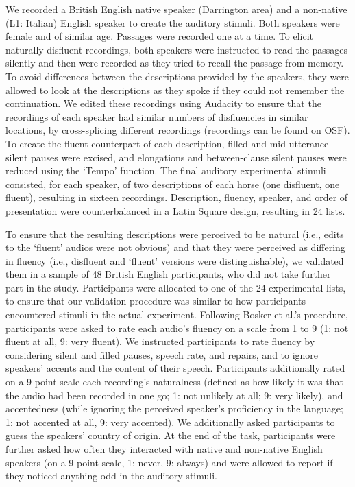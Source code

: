\documentclass[
  man,floatsintext]{apa7}
\begin{document}
We recorded a British English native speaker (Darrington area) and a non-native (L1: Italian) English speaker to create the auditory stimuli. Both speakers were female and of similar age. Passages were recorded one at a time. To elicit naturally disfluent recordings, both speakers were instructed to read the passages silently and then were recorded as they tried to recall the passage from memory. To avoid differences between the descriptions provided by the speakers, they were allowed to look at the descriptions as they spoke if they could not remember the continuation. We edited these recordings using Audacity to ensure that the recordings of each speaker had similar numbers of disfluencies in similar locations, by cross-splicing different recordings (recordings can be found on OSF). To create the fluent counterpart of each description, filled and mid-utterance silent pauses were excised, and elongations and between-clause silent pauses were reduced using the `Tempo' function. The final auditory experimental stimuli consisted, for each speaker, of two descriptions of each horse (one disfluent, one fluent), resulting in sixteen recordings. Description, fluency, speaker, and order of presentation were counterbalanced in a Latin Square design, resulting in 24 lists.

To ensure that the resulting descriptions were perceived to be natural (i.e., edits to the `fluent' audios were not obvious) and that they were perceived as differing in fluency (i.e., disfluent and `fluent' versions were distinguishable), we validated them in a sample of 48 British English participants, who did not take further part in the study. Participants were allocated to one of the 24 experimental lists, to ensure that our validation procedure was similar to how participants encountered stimuli in the actual experiment. Following Bosker et al.'s procedure, participants were asked to rate each audio's fluency on a scale from 1 to 9 (1: not fluent at all, 9: very fluent). We instructed participants to rate fluency by considering silent and filled pauses, speech rate, and repairs, and to ignore speakers' accents and the content of their speech. Participants additionally rated on a 9-point scale each recording's naturalness (defined as how likely it was that the audio had been recorded in one go; 1: not unlikely at all; 9: very likely), and accentedness (while ignoring the perceived speaker's proficiency in the language; 1: not accented at all, 9: very accented). We additionally asked participants to guess the speakers' country of origin. At the end of the task, participants were further asked how often they interacted with native and non-native English speakers (on a 9-point scale, 1: never, 9: always) and were allowed to report if they noticed anything odd in the auditory stimuli.
\end{document}

